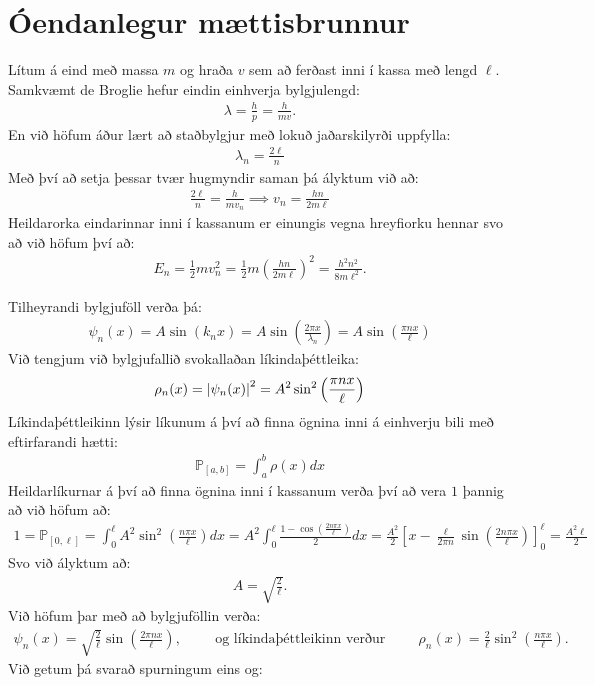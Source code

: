 \ifdefined \wholebook \else\documentclass[oneside]{book}\usepackage{EdlBook}\graphicspath{{figures/}}
\begin{document}
\section{Óendanlegur mættisbrunnur}

Lítum á eind með massa $m$ og hraða $v$ sem að ferðast inni í kassa með lengd $\ell$. Samkvæmt de Broglie hefur eindin einhverja bylgjulengd:
\begin{align*}
    \lambda = \frac{h}{p} = \frac{h}{mv}.
\end{align*}
En við höfum áður lært að staðbylgjur með lokuð jaðarskilyrði uppfylla:
\begin{align*}
    \lambda_n = \frac{2\ell}{n}
\end{align*}
Með því að setja þessar tvær hugmyndir saman þá ályktum við að:
\begin{align*}
    \frac{2\ell}{n} = \frac{h}{mv_n} \implies v_n = \frac{hn}{2m\ell}
\end{align*}
Heildarorka eindarinnar inni í kassanum er einungis vegna hreyfiorku hennar svo að við höfum því að:
\begin{align*}
    E_n = \frac{1}{2}mv_n^2 = \frac{1}{2}m \left( \frac{hn}{2m\ell} \right)^2 = \frac{h^2n^2}{8m\ell^2}.
\end{align*}

Tilheyrandi bylgjuföll verða þá:
\begin{align*}
    \psi_n(x) = A\sin(k_nx) = A\sin\left(\frac{2\pi x}{\lambda_n}\right) = A\sin\left( \frac{\pi n x}{\ell} \right)
\end{align*}
Við tengjum við bylgjufallið svokallaðan líkindaþéttleika:
\begin{align*}
    \rho_n(x) = \abs{\psi_n(x)}^2 = A^2 \sin^2\left( \frac{\pi n x}{\ell} \right)
\end{align*}
Líkindaþéttleikinn lýsir líkunum á því að finna ögnina inni á einhverju bili með eftirfarandi hætti:
\begin{align*}
    \mathds{P}_{[a,b]} = \int_{a}^{b} \rho(x)dx  
\end{align*}
Heildarlíkurnar á því að finna ögnina inni í kassanum verða því að vera $1$ þannig að við höfum að:
\begin{align*}
    1 = \mathds{P}_{[0,\ell]} = \int_{0}^{\ell} A^2 \sin^2\left(\frac{n\pi x}{\ell}\right)dx = A^2 \int_{0}^{\ell} \frac{1-\cos\left(\frac{2n\pi x}{\ell}\right)}{2} dx = \frac{A^2}{2}\left[ x - \frac{\ell}{2 \pi n} \sin\left(\frac{2 n \pi x}{\ell}\right) \right]_{0}^{\ell} = \frac{A^2 \ell}{2}
\end{align*}
Svo við ályktum að:
\begin{align*}
    A = \sqrt{\frac{2}{\ell}}.
\end{align*}
Við höfum þar með að bylgjuföllin verða:
\begin{align*}
    \psi_n(x) = \sqrt{\frac{2}{\ell}} \sin\left( \frac{2\pi n x}{\ell} \right), \hspace{1cm} \text{og líkindaþéttleikinn verður} \hspace{1cm} \rho_n(x) = \frac{2}{\ell}\sin^2\left( \frac{n\pi x}{\ell} \right).
\end{align*}
Við getum þá svarað spurningum eins og:
\end{document}
